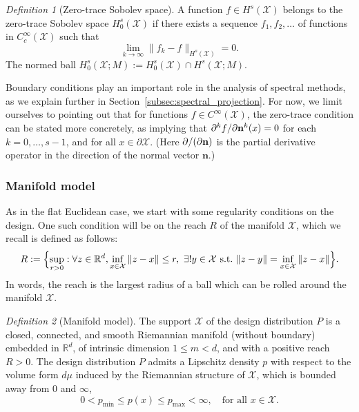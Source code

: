\documentclass[aos]{imsart}
\theoremstyle{plain}
\theoremstyle{definition}
\theoremstyle{remark}
\newtheorem{definition}{Definition}
\def\R{\mathbb{R}}
\newcommand{\mc}[1]{\mathcal{#1}}
\newcommand{\Reals}{\mathbb{R}} %
\newcommand{\Rd}{\Reals^d}
\newcommand{\1}{\mathbf{1}}
\begin{document}
\begin{definition}[Zero-trace Sobolev space]
	\label{def:zero_trace_sobolev_space}
	A function $f \in H^s(\mc{X})$ belongs to the zero-trace Sobolev space $H_0^s(\mc{X})$ if there exists a sequence $f_1,f_2,\ldots$ of functions in $C_c^{\infty}(\mc{X})$ such that
	\begin{equation*}
	\lim_{k \to \infty}\|f_k - f\|_{H^s(\mc{X})} = 0.
	\end{equation*}
	The normed ball $H_0^{s}(\mc{X};M) := H_0^{s}(\mc{X}) \cap H^{s}(\mc{X};M)$.
\end{definition}
Boundary conditions play an important role in the analysis of spectral methods, as we explain further in Section~\ref{subsec:spectral_projection}. For now, we limit ourselves to pointing out that for functions $f \in C^\infty(\mc{X})$, the zero-trace condition can be stated more concretely, as implying that $\partial^{k}f/\partial{\bf n}^k(x) = 0$ for each $k = 0,\ldots,s - 1$, and for all $x \in \partial\mc{X}$. (Here $\partial/(\partial {\bf n})$ is the partial derivative operator in the direction of the normal vector $\mathbf{n}$.)

\subsubsection{Manifold model}
As in the flat Euclidean case, we start with some regularity conditions on the design. One such condition will be on the reach $R$ of the manifold $\mc{X}$, which we recall is defined as follows:
\begin{equation*}
R := \Bigl\{\sup_{r > 0}: \forall z \in \Rd, \inf_{x \in \mc{X}} \|z - x\| \leq r, ~\exists! y \in \mc{X}~\mathrm{s.t.}~\|z - y\| = \inf_{x \in \mc{X}} \|z - x\|\Bigr\}.
\end{equation*}
In words, the reach is the largest radius of a ball which can be rolled around the manifold $\mc{X}$.
\begin{definition}[Manifold model]
	\label{def:model_manifold}
	The support $\mc{X}$ of the design distribution $P$ is a closed, connected, and smooth Riemannian manifold (without boundary) embedded in $\Rd$, of intrinsic dimension $1 \leq m < d$, and with a positive reach $R > 0$. The design distribution $P$ admits a Lipschitz density $p$ with respect to the volume form $d\mu$ induced by the Riemannian structure of $\mc{X}$, which is bounded away from $0$ and $\infty$,
	\begin{equation*}
	0 < p_{\min} \leq p(x) \leq p_{\max} < \infty, \quad \textrm{for all $x \in \mc{X}$.}
	\end{equation*}
\end{definition}
\end{document}
